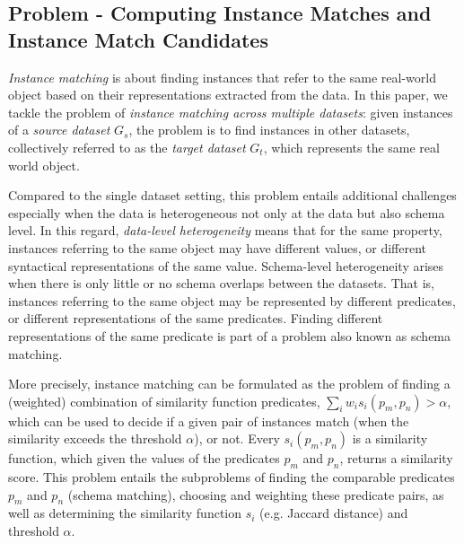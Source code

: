 \subsection{Problem - Computing Instance Matches and Instance Match Candidates} \emph{Instance matching} is about finding instances that refer to the same real-world object based on their representations extracted from the data. In this paper, we tackle the problem of \emph{instance matching across multiple datasets}: given instances of a \emph{source dataset} $G_s$, the problem is to find instances in other datasets, collectively referred to as the \emph{target dataset} $G_t$, which represents the same real world object. 

Compared to the single dataset setting, this problem entails additional challenges especially when the data is heterogeneous not only at the data but also schema level. In this regard, \emph{data-level heterogeneity} means that for the same property, instances referring to the same object may have different values, or different syntactical representations of the same value.  Schema-level heterogeneity arises when there is only little or no schema overlaps between the datasets. That is, instances referring to the same object may be represented by different predicates, or different representations of the same predicates. Finding different representations of the same predicate is part of a problem also known as schema matching. 

More precisely, instance matching can be formulated as the problem of finding a (weighted) combination of similarity function predicates, $\sum_i{w_i s_i(p_m,p_n)} > \alpha$, which can be used to decide if a given pair of instances match (when the similarity exceeds the threshold $\alpha$), or not. Every $s_i(p_m,p_n)$ is a similarity function, which given the values of the predicates $p_m$ and $p_n$, returns a similarity score. This problem entails the subproblems of finding the comparable predicates $p_m$ and $p_n$ (schema matching), choosing and weighting these predicate pairs, as well as determining the similarity function $s_i$ (e.g. Jaccard distance) and threshold $\alpha$.  

